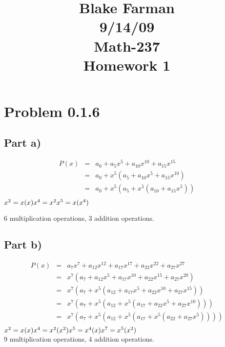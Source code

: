\documentclass[12pt]{article}
\title{Blake Farman\\9/14/09\\Math-237\\Homework 1\\}
\date{}
\begin{document}
\maketitle
\newpage

\section*{Problem 0.1.6}

\subsection*{Part a)}
\begin{eqnarray*}
P(x) & = & a_0 + a_{5}x^{5} + a_{10}x^{10} + a_{15}x^{15}\\
& = & a_{0} + x^{5}(a_{5} + a_{10}x^{5} + a_{15}x^{10})\\
& = & a_{0} + x^{5}(a_{5} + x^{5}(a_{10} + a_{15}x^{5}))\\
\end{eqnarray*}
\(x^{2} = x(x)\\
x^{4} = x^{2}\\
x^{5} = x(x^{4})\\
\)

6 multiplication operations, 3 addition operations.

\subsection*{Part b)}
\begin{eqnarray*}
P(x) & = & a_{7}x^{7} + a_{12}x^{12} + a_{17}x^{17} + a_{22}x^{22} + a_{27}x^{27}\\
& = & x^{7}(a_{7} + a_{12}x^5 + a_{17}x^{10} + a_{22}x^{15} + a_{27}x^{20})\\
& = & x^{7}(a_{7} + x^{5}(a_{12} + a_{17}x^{5} + a_{22}x^{10} + a_{27}x^{15}))\\
& = & x^{7}(a_{7} + x^{5}(a_{12} + x^{5}(a_{17} + a_{22}x^{5} + a_{27}x^{10})))\\
& = & x^{7}(a_{7} + x^{5}(a_{12} + x^{5}(a_{17} + x^{5}(a_{22} + a_{27}x^{5}))))\\
\end{eqnarray*}
\(x^{2} = x(x)\\
x^{4} = x^{2}(x^{2})\\
x^{5} = x^{4}(x)\\
x^{7} = x^{5}(x^{2})\)\\

9 multiplication operations, 4 addition operations.\\
\end{document}
